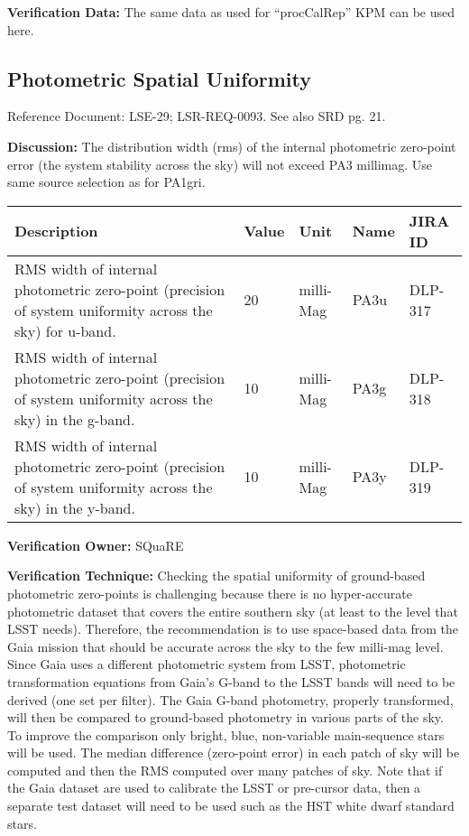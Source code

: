 \textbf{Verification Data:} The same data as used for ``procCalRep'' KPM
can be used here.

\subsection{Photometric Spatial
Uniformity}\label{photometric-spatial-uniformity}

Reference Document: LSE-29; LSR-REQ-0093. See also SRD pg. 21.

\textbf{Discussion:} The distribution width (rms) of the internal
photometric zero-point error (the system stability across the sky) will
not exceed PA3 millimag. Use same source selection as for PA1gri.

\begin{longtable}[]{@{}lllll@{}}
\toprule
Description & Value & Unit & Name & JIRA ID\tabularnewline
\midrule
\endhead
RMS width of internal photometric zero-point (precision of system
uniformity across the sky) for u-band. & 20 & milli-Mag & PA3u &
DLP-317\tabularnewline
RMS width of internal photometric zero-point (precision of system
uniformity across the sky) in the g-band. & 10 & milli-Mag & PA3g &
DLP-318\tabularnewline
RMS width of internal photometric zero-point (precision of system
uniformity across the sky) in the y-band. & 10 & milli-Mag & PA3y &
DLP-319\tabularnewline
\bottomrule
\end{longtable}

\textbf{Verification Owner:} SQuaRE

\textbf{Verification Technique:} Checking the spatial uniformity of
ground-based photometric zero-points is challenging because there is no
hyper-accurate photometric dataset that covers the entire southern sky
(at least to the level that LSST needs). Therefore, the recommendation
is to use space-based data from the Gaia mission that should be accurate
across the sky to the few milli-mag level. Since Gaia uses a different
photometric system from LSST, photometric transformation equations from
Gaia's G-band to the LSST bands will need to be derived (one set per
filter). The Gaia G-band photometry, properly transformed, will then be
compared to ground-based photometry in various parts of the sky. To
improve the comparison only bright, blue, non-variable main-sequence
stars will be used. The median difference (zero-point error) in each
patch of sky will be computed and then the RMS computed over many
patches of sky. Note that if the Gaia dataset are used to calibrate the
LSST or pre-cursor data, then a separate test dataset will need to be
used such as the HST white dwarf standard stars.

